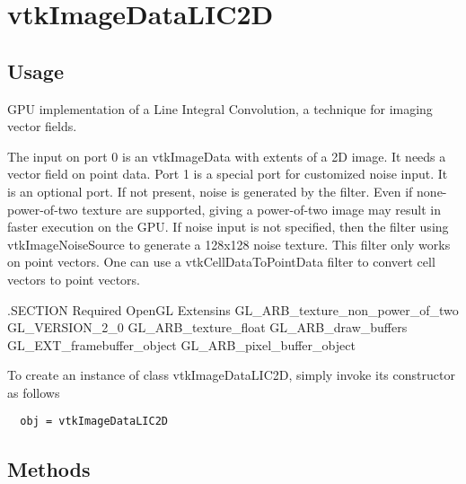 \section{vtkImageDataLIC2D}

\subsection{Usage}

  GPU implementation of a Line Integral Convolution, a technique for
  imaging  vector fields.

  The input on port 0 is an vtkImageData with extents of a 2D image. It needs
  a vector field on point data.
  Port 1 is a special port for customized noise input. It is an optional port.
  If not present, noise is generated by the filter. Even if none-power-of-two
  texture are supported, giving a power-of-two image may result in faster
  execution on the GPU.
  If noise input is not specified, then the filter using vtkImageNoiseSource to
  generate a 128x128 noise texture.
  This filter only works on point vectors. One can use a
  vtkCellDataToPointData filter to convert cell vectors to point vectors.

 .SECTION Required OpenGL Extensins
  GL\_ARB\_texture\_non\_power\_of\_two
  GL\_VERSION\_2\_0
  GL\_ARB\_texture\_float
  GL\_ARB\_draw\_buffers
  GL\_EXT\_framebuffer\_object
  GL\_ARB\_pixel\_buffer\_object


To create an instance of class vtkImageDataLIC2D, simply
invoke its constructor as follows
\begin{verbatim}
  obj = vtkImageDataLIC2D
\end{verbatim}
\subsection{Methods}

